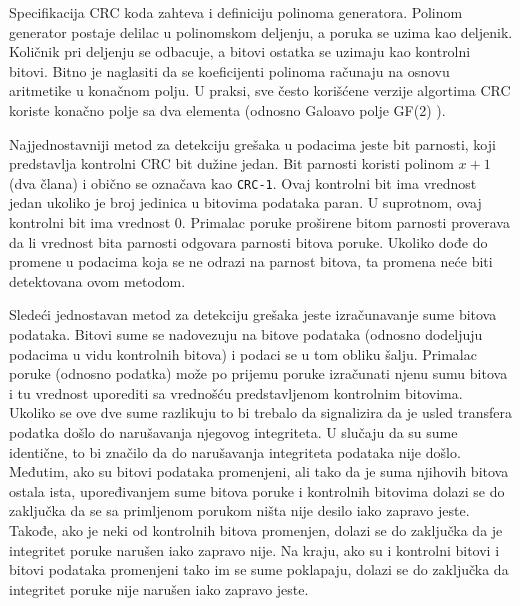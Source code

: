 \documentclass[12pt,oneside]{memoir}
\begin{document}


Specifikacija CRC koda zahteva i definiciju polinoma generatora. Polinom generator postaje delilac u polinomskom deljenju, a poruka se uzima kao deljenik. Količnik pri deljenju se odbacuje, a bitovi ostatka se uzimaju kao kontrolni bitovi. Bitno je naglasiti da se koeficijenti polinoma računaju na osnovu aritmetike u konačnom polju. U praksi, sve često korišćene verzije algortima CRC koriste konačno polje sa dva elementa (odnosno Galoavo polje GF(2) \cite{galois_field}). 

Najjednostavniji metod za detekciju grešaka u podacima jeste bit parnosti, koji predstavlja kontrolni CRC bit dužine jedan. Bit parnosti koristi polinom $x+1$ (dva člana) i obično se označava kao \texttt{CRC-1}. Ovaj kontrolni bit ima vrednost jedan ukoliko je broj jedinica u bitovima podataka paran. U suprotnom, ovaj kontrolni bit ima vrednost 0. Primalac poruke proširene bitom parnosti proverava da li vrednost bita parnosti odgovara parnosti bitova poruke. Ukoliko dođe do promene u podacima koja se ne odrazi na parnost bitova, ta promena neće biti detektovana ovom metodom.

Sledeći jednostavan metod za detekciju grešaka jeste izračunavanje sume bitova podataka. Bitovi sume se nadovezuju na bitove podataka (odnosno dodeljuju podacima u vidu kontrolnih bitova) i podaci se u tom obliku šalju. Primalac poruke (odnosno podatka) može po prijemu poruke izračunati njenu sumu bitova i tu vrednost uporediti sa vrednošću predstavljenom kontrolnim bitovima. Ukoliko se ove dve sume razlikuju to bi trebalo da signalizira da je usled transfera podatka 
došlo do narušavanja njegovog integriteta. U slučaju da su sume identične, to bi značilo da do narušavanja integriteta podataka nije došlo.
Međutim, ako su bitovi podataka promenjeni, 
ali tako da je suma njihovih bitova ostala ista, upoređivanjem sume bitova poruke i 
kontrolnih bitovima dolazi se do zaključka da se sa primljenom 
porukom ništa nije desilo iako zapravo jeste. Takođe, ako je neki od kontrolnih bitova promenjen, dolazi se do zaključka da je integritet poruke narušen iako zapravo nije. Na kraju, ako su i kontrolni bitovi i bitovi podataka promenjeni tako im se sume poklapaju, dolazi se do zaključka da integritet poruke nije narušen iako zapravo jeste.
\end{document}
